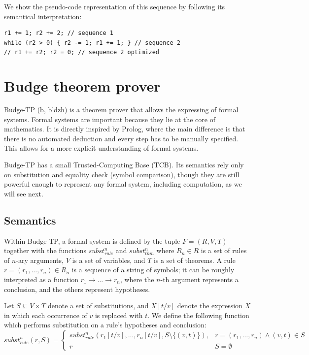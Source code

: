 \documentclass{article}
\begin{document}
We show the pseudo-code representation of this sequence by following its semantical interpretation:

\begin{verbatim}
r1 += 1; r2 += 2; // sequence 1
while (r2 > 0) { r2 -= 1; r1 += 1; } // sequence 2
// r1 += r2; r2 = 0; // sequence 2 optimized
\end{verbatim}

\section{Budge theorem prover}

Budge-TP (b\textturnv\textdyoghlig, b'dzh) is a theorem prover\cite{b7} that allows the expressing of formal systems. Formal systems are important because they lie at the core of mathematics. It is directly inspired by Prolog\cite{b5}, where the main difference is that there is no automated deduction and every step has to be manually specified. This allows for a more explicit understanding of formal systems.

Budge-TP has a small Trusted-Computing Base (TCB). Its semantics rely only on substitution and equality check (symbol comparison), though they are still powerful enough to represent any formal system, including computation, as we will see next.

\subsection{Semantics}

Within Budge-TP, a formal system is defined by the tuple $F = (R, V, T)$ together with the functions $subst_{rule}^n$ and $subst_{thm}^n$ where $R_n \in R$ is a set of rules of $n$-ary arguments, $V$ is a set of variables, and $T$ is a set of theorems. A rule $r = (r_1, \ldots, r_n) \in R_n$ is a sequence of a string of symbols; it can be roughly interpreted as a function $r_1 \to \ldots \to r_n$, where the $n$-th argument represents a conclusion, and the others represent hypotheses.

Let $S \subseteq V \times T$ denote a set of substitutions, and $X[t/v]$ denote the expression $X$ in which each occurrence of $v$ is replaced with $t$. We define the following function which performs substitution on a rule's hypotheses and conclusion:
$$ subst_{rule}^n(r, S) = {
\begin{cases}
subst_{rule}^n(r_1[t/v], \ldots, r_n[t/v], S \setminus \{(v, t) \}), & r = (r_1, \ldots, r_n) \land (v, t) \in S \\
r & S = \emptyset
\end{cases}}
$$
\end{document}
